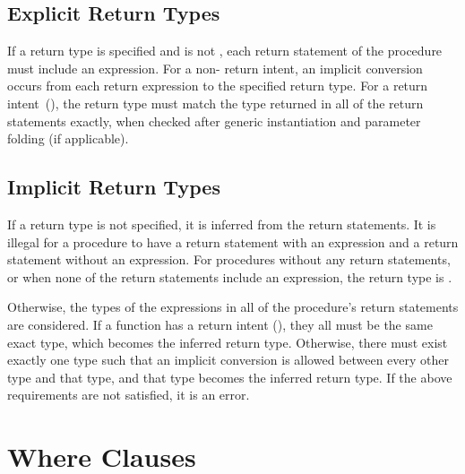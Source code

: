 
\subsection{Explicit Return Types}
\label{Explicit_Return_Types}

If a return type is specified and is not ,
each return statement of the procedure must include an expression.
For a non- return intent, an implicit conversion occurs
from each return expression to the specified return type.
For a  return intent~(), the return
type must match the type returned in all of the return statements
exactly, when checked after generic instantiation and parameter folding
(if applicable).

\subsection{Implicit Return Types}
\label{Implicit_Return_Types}

If a return type is not specified, it is inferred from the return statements.
It is illegal for a procedure to have a return statement with an expression
and a return statement without an expression.
For procedures without any return statements, or when none of the
return statements include an expression, the return type is .

Otherwise, the types of the expressions in all of the procedure's
return statements are considered.
If a function has a  return intent (), they
all must be the same exact type, which becomes the inferred return type.
Otherwise, there must exist exactly one type such that an implicit conversion
is allowed between every other type and that type, and that type becomes the
inferred return type.
If the above requirements are not satisfied, it is an error.

\section{Where Clauses}
\label{Where_Clauses}

